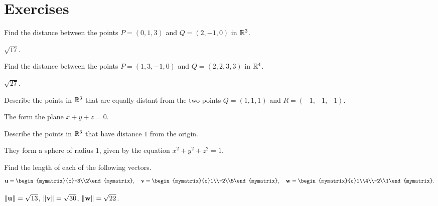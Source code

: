 \section*{Exercises}

\begin{ex}
  Find the distance between the points $P=(0,1,3)$ and
  $Q=(2,-1,0)$ in $\mathbb{R}^3$.
  \begin{sol}
    $\sqrt{17}$.
  \end{sol}
\end{ex}

\begin{ex}
  Find the distance between the points $P=(1,3,-1,0)$ and
  $Q=(2,2,3,3)$ in $\mathbb{R}^4$.
  \begin{sol}
    $\sqrt{27}$.
  \end{sol}
\end{ex}

\begin{ex}
  Describe the points in $\mathbb{R}^3$ that are equally distant from the two
  points $Q=(1,1,1)$ and $R=(-1,-1,-1)$.
  \begin{sol}
    The form the plane $x+y+z=0$.
  \end{sol}
\end{ex}

\begin{ex}
  Describe the points in $\mathbb{R}^3$ that have distance $1$ from the origin.
  \begin{sol}
    They form a sphere of radius $1$, given by the equation
    $x^2+y^2+z^2=1$.
  \end{sol}
\end{ex}

\begin{ex}
  Find the length of each of the following vectors.
  \begin{equation*}
    \vect{u}=\begin{mymatrix}{c}-3\\2\end{mymatrix}, \quad
    \vect{v}=\begin{mymatrix}{c}1\\-2\\5\end{mymatrix}, \quad
    \vect{w}=\begin{mymatrix}{c}1\\4\\-2\\1\end{mymatrix}.
  \end{equation*}
  \begin{sol}
    $\norm{\vect{u}} = \sqrt{13}$, $\norm{\vect{v}} = \sqrt{30}$,
    $\norm{\vect{w}} = \sqrt{22}$.
  \end{sol}
\end{ex}

